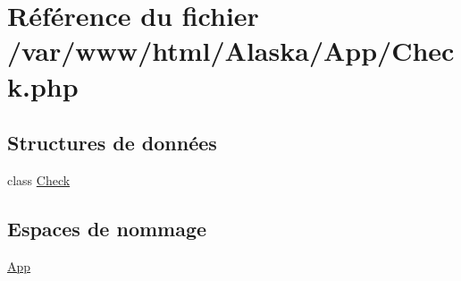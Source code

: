 \hypertarget{_check_8php}{}\section{Référence du fichier /var/www/html/\+Alaska/\+App/\+Check.php}
\label{_check_8php}
\subsection*{Structures de données}
\begin{DoxyCompactItemize}
\item 
class \hyperlink{class_app_1_1_check}{Check}
\end{DoxyCompactItemize}
\subsection*{Espaces de nommage}
\begin{DoxyCompactItemize}
\item 
 \hyperlink{namespace_app}{App}
\end{DoxyCompactItemize}
